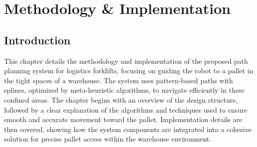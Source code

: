 \chapter{Methodology \& Implementation}

\renewcommand{\chaptername}{Chapter}
\section*{Introduction}

This chapter details the methodology and implementation of the proposed path planning system for logistics forklifts, 
focusing on guiding the robot to a pallet in the tight spaces of a warehouse. The system uses pattern-based paths with 
splines, optimized by meta-heuristic algorithms, to navigate efficiently in these confined areas. The chapter begins with 
an overview of the design structure, followed by a clear explanation of the algorithms and techniques used to ensure 
smooth and accurate movement toward the pallet. Implementation details are then covered, showing how the system 
components are integrated into a cohesive solution for precise pallet access within the warehouse environment.

